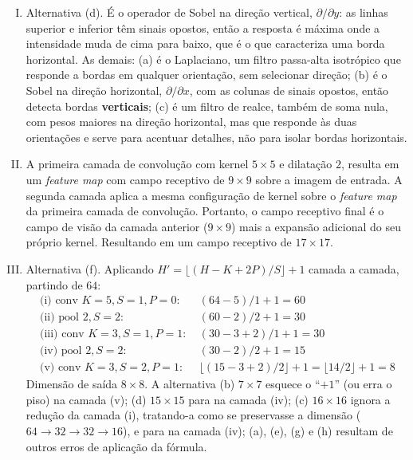 \documentclass{dlproblemset}
\begin{document}
\begin{enumerate}[I)]
    Resultado Final
    $$
    \text{Output} = \begin{bmatrix} 0 \end{bmatrix}
    $$

\item Alternativa (d). É o operador de Sobel na direção vertical, $\partial/\partial y$: as linhas superior e inferior têm sinais opostos, então a resposta é máxima onde a intensidade muda de cima para baixo, que é o que caracteriza uma borda horizontal. As demais: (a) é o Laplaciano, um filtro passa-alta isotrópico que responde a bordas em qualquer orientação, sem selecionar direção; (b) é o Sobel na direção horizontal, $\partial/\partial x$, com as colunas de sinais opostos, então detecta bordas \textbf{verticais}; (c) é um filtro de realce, também de soma nula, com pesos maiores na direção horizontal, mas que responde às duas orientações e serve para acentuar detalhes, não para isolar bordas horizontais. %

   \item A primeira camada de convolução com kernel $5\times5$ e dilatação $2$, resulta em um \textit{feature map} com campo receptivo de $9\times9$ sobre a imagem de entrada. A segunda camada aplica a mesma configuração de kernel sobre o \textit{feature map} da primeira camada de convolução. Portanto, o campo receptivo final é o campo de visão da camada anterior ($9\times9$) mais a expansão adicional do seu próprio kernel. Resultando em um campo receptivo de $17\times17$. %

\item Alternativa (f). Aplicando $H' = \lfloor (H - K + 2P)/S \rfloor + 1$ camada a camada, partindo de $64$:
\begin{align*}
    \text{(i) conv } K{=}5, S{=}1, P{=}0:&\ (64 - 5)/1 + 1 = 60 \\
    \text{(ii) pool } 2, S{=}2:&\ (60 - 2)/2 + 1 = 30 \\
    \text{(iii) conv } K{=}3, S{=}1, P{=}1:&\ (30 - 3 + 2)/1 + 1 = 30 \\
    \text{(iv) pool } 2, S{=}2:&\ (30 - 2)/2 + 1 = 15 \\
    \text{(v) conv } K{=}3, S{=}2, P{=}1:&\ \lfloor (15 - 3 + 2)/2 \rfloor + 1 = \lfloor 14/2 \rfloor + 1 = 8
\end{align*}
Dimensão de saída $8 \times 8$. A alternativa (b) $7 \times 7$ esquece o ``$+1$'' (ou erra o piso) na camada (v); (d) $15 \times 15$ para na camada (iv); (c) $16 \times 16$ ignora a redução da camada (i), tratando-a como se preservasse a dimensão ($64 \to 32 \to 32 \to 16$), e para na camada (iv); (a), (e), (g) e (h) resultam de outros erros de aplicação da fórmula. %


\end{enumerate}
\end{document}
